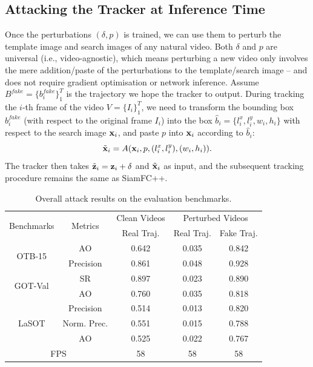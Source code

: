\documentclass{article}
\begin{document}
\subsection{Attacking the Tracker at Inference Time}

Once the perturbations $(\delta, p)$ is trained, we can use them to perturb the template image and search images of any natural video. Both $\delta$ and $p$ are universal (i.e., video-agnostic), which means perturbing a new video only involves the mere addition/paste of the perturbations to the template/search image -- and does not require gradient optimisation or network inference.
Assume $B^{fake}=\{b^{fake}_i\}_1^{T}$ is the trajectory we hope the tracker to output.
During tracking the $i$-th frame of the video $V=\{I_i\}_1^T$, we need to transform the bounding box $b^{fake}_i$ (with respect to the original frame $I_i$) into the box $\hat b_i=\{l^x_i, l^y_i, w_i, h_i\}$ with respect to the search image $\textbf x_i$, and paste $p$ into $\textbf x_i$ according to $\hat b_i$:
\begin{equation}
\tilde{\textbf x}_i = A(\textbf x_i, p, (l^x_i, l^y_i), (w_i, h_i)).
\end{equation}
The tracker then takes $\tilde{\textbf z}_i=\textbf z_i+\delta$ and $\tilde{ \textbf x}_i$ as input, and the subsequent tracking procedure remains the same as SiamFC++.

\begin{table}
\centering
\footnotesize
\tabcolsep=2.0pt
\begin{tabular}{c c | c | c | c}
\toprule
\multirow{2}{*}[-2pt]{Benchmarks} & \multirow{2}{*}[-2pt]{Metrics} & Clean Videos    & \multicolumn{2}{c}{Perturbed Videos}  \\
\cmidrule{3-5}
                          &                         & Real Traj. & Real Traj. & Fake Traj.     \\ 
\midrule
\multirow{2}{*}{OTB-15} 
& AO   & 0.642 & 0.035 & 0.842\\
& Precision & 0.861 & 0.048 & 0.928\\
\midrule
\multirow{2}{*}{GOT-Val} 
& SR & 0.897 & 0.023 & 0.890\\
& AO 				   & 0.760 & 0.035 & 0.818 \\
\midrule
\multirow{3}{*}{LaSOT} 
& Precision       & 0.514 & 0.013 & 0.820\\
& Norm. Prec. & 0.551 & 0.015 & 0.788\\
& AO & 0.525 & 0.022 & 0.767\\
\midrule
\multicolumn{2}{c|}{FPS} & 58 & 58 & 58\\
\bottomrule
\end{tabular}
\caption{Overall attack results on the evaluation benchmarks.}
\label{tab:benchmark results}
\end{table}
\end{document}
